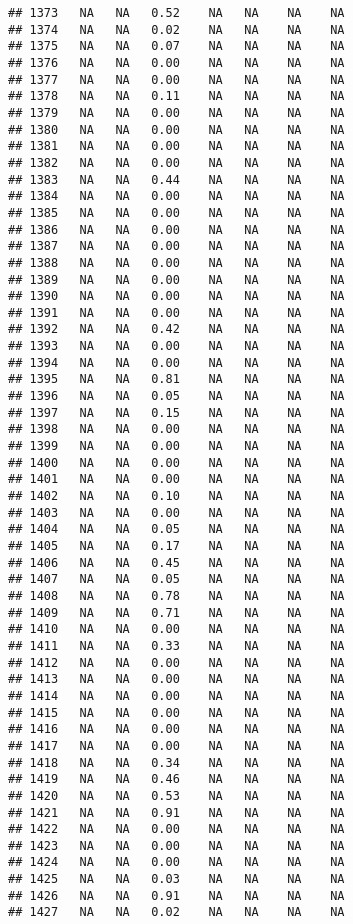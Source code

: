 \documentclass{article}\usepackage{graphicx, color}
\makeatletter
\newenvironment{kframe}{%
 \def\at@end@of@kframe{}%
 \ifinner\ifhmode%
  \def\at@end@of@kframe{\end{minipage}}%
  \begin{minipage}{\columnwidth}%
 \fi\fi%
 \def\FrameCommand##1{\hskip\@totalleftmargin \hskip-\fboxsep
 \colorbox{shadecolor}{##1}\hskip-\fboxsep
     \hskip-\linewidth \hskip-\@totalleftmargin \hskip\columnwidth}%
 \MakeFramed {\advance\hsize-\width
   \@totalleftmargin\z@ \linewidth\hsize
   \@setminipage}}%
 {\par\unskip\endMakeFramed%
 \at@end@of@kframe}
\newenvironment{knitrout}{}{} %
\makeatother
\begin{document}
\begin{knitrout}
\begin{kframe}
\begin{verbatim}
## 1373   NA   NA   0.52    NA   NA    NA    NA
## 1374   NA   NA   0.02    NA   NA    NA    NA
## 1375   NA   NA   0.07    NA   NA    NA    NA
## 1376   NA   NA   0.00    NA   NA    NA    NA
## 1377   NA   NA   0.00    NA   NA    NA    NA
## 1378   NA   NA   0.11    NA   NA    NA    NA
## 1379   NA   NA   0.00    NA   NA    NA    NA
## 1380   NA   NA   0.00    NA   NA    NA    NA
## 1381   NA   NA   0.00    NA   NA    NA    NA
## 1382   NA   NA   0.00    NA   NA    NA    NA
## 1383   NA   NA   0.44    NA   NA    NA    NA
## 1384   NA   NA   0.00    NA   NA    NA    NA
## 1385   NA   NA   0.00    NA   NA    NA    NA
## 1386   NA   NA   0.00    NA   NA    NA    NA
## 1387   NA   NA   0.00    NA   NA    NA    NA
## 1388   NA   NA   0.00    NA   NA    NA    NA
## 1389   NA   NA   0.00    NA   NA    NA    NA
## 1390   NA   NA   0.00    NA   NA    NA    NA
## 1391   NA   NA   0.00    NA   NA    NA    NA
## 1392   NA   NA   0.42    NA   NA    NA    NA
## 1393   NA   NA   0.00    NA   NA    NA    NA
## 1394   NA   NA   0.00    NA   NA    NA    NA
## 1395   NA   NA   0.81    NA   NA    NA    NA
## 1396   NA   NA   0.05    NA   NA    NA    NA
## 1397   NA   NA   0.15    NA   NA    NA    NA
## 1398   NA   NA   0.00    NA   NA    NA    NA
## 1399   NA   NA   0.00    NA   NA    NA    NA
## 1400   NA   NA   0.00    NA   NA    NA    NA
## 1401   NA   NA   0.00    NA   NA    NA    NA
## 1402   NA   NA   0.10    NA   NA    NA    NA
## 1403   NA   NA   0.00    NA   NA    NA    NA
## 1404   NA   NA   0.05    NA   NA    NA    NA
## 1405   NA   NA   0.17    NA   NA    NA    NA
## 1406   NA   NA   0.45    NA   NA    NA    NA
## 1407   NA   NA   0.05    NA   NA    NA    NA
## 1408   NA   NA   0.78    NA   NA    NA    NA
## 1409   NA   NA   0.71    NA   NA    NA    NA
## 1410   NA   NA   0.00    NA   NA    NA    NA
## 1411   NA   NA   0.33    NA   NA    NA    NA
## 1412   NA   NA   0.00    NA   NA    NA    NA
## 1413   NA   NA   0.00    NA   NA    NA    NA
## 1414   NA   NA   0.00    NA   NA    NA    NA
## 1415   NA   NA   0.00    NA   NA    NA    NA
## 1416   NA   NA   0.00    NA   NA    NA    NA
## 1417   NA   NA   0.00    NA   NA    NA    NA
## 1418   NA   NA   0.34    NA   NA    NA    NA
## 1419   NA   NA   0.46    NA   NA    NA    NA
## 1420   NA   NA   0.53    NA   NA    NA    NA
## 1421   NA   NA   0.91    NA   NA    NA    NA
## 1422   NA   NA   0.00    NA   NA    NA    NA
## 1423   NA   NA   0.00    NA   NA    NA    NA
## 1424   NA   NA   0.00    NA   NA    NA    NA
## 1425   NA   NA   0.03    NA   NA    NA    NA
## 1426   NA   NA   0.91    NA   NA    NA    NA
## 1427   NA   NA   0.02    NA   NA    NA    NA

\end{verbatim}
\end{kframe}
\end{knitrout}
\end{document}
